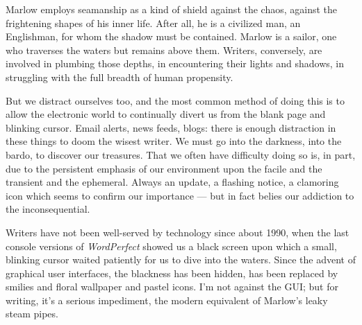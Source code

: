 \documentclass[letterpaper,oneside]{memoir}
\begin{document}
Marlow employs seamanship as a kind of shield against the chaos, against the frightening shapes of his inner life. After all, he is a civilized man, an Englishman, for whom the shadow must be contained. Marlow is a sailor, one who traverses the waters but remains above them. Writers, conversely, are involved in plumbing those depths, in encountering their lights and shadows, in struggling with the full breadth of human propensity.

But we distract ourselves too, and the most common method of doing this is to allow the electronic world to continually divert us from the blank page and blinking cursor. Email alerts, news feeds, blogs: there is enough distraction in these things to doom the wisest writer. We must go into the darkness, into the bardo, to discover our treasures. That we often have difficulty doing so is, in part, due to the persistent emphasis of our environment upon the facile and the transient and the ephemeral. Always an update, a flashing notice, a clamoring icon which seems to confirm our importance --- but in fact belies our addiction to the inconsequential.

Writers have not been well-served by technology since about 1990, when the last console versions of \textit{WordPerfect} showed us a black screen upon which a small, blinking cursor waited patiently for us to dive into the waters. Since the advent of graphical user interfaces, the blackness has been hidden, has been replaced by smilies and floral wallpaper and pastel icons. I'm not against the \textsc{GUI}; but for writing, it's a serious impediment, the modern equivalent of Marlow's leaky steam pipes.
\end{document}
